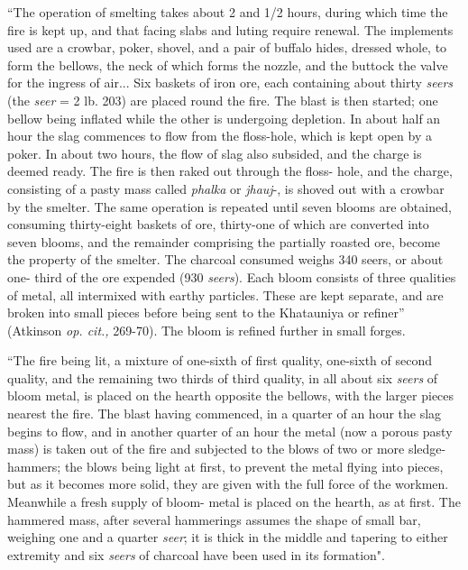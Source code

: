 {\footnotesize{“The operation of smelting takes about 2 and 1/2 hours, during which time the fire is kept up, and that facing slabs and luting require renewal. The implements used are a crowbar, poker, shovel, and a pair of buffalo hides, dressed whole, to form the bellows, the neck of which forms the nozzle, and the buttock the valve for the ingress of air... Six baskets of iron ore, each containing about thirty {\it seers} (the {\it seer}	= 2 lb. 203) are placed round the fire. The blast is then started; one bellow being inflated while the other is undergoing depletion. In about half an hour the slag commences to flow from the floss-hole, which is kept open by a poker. In about two hours, the flow of slag also subsided, and the charge is deemed ready. The fire is then raked out through the floss- hole, and the charge, consisting of a pasty mass called {\it phalka} or {\it jhauj}-, is shoved out with a crowbar by the smelter. The same operation is repeated until seven blooms are obtained, consuming thirty-eight baskets of ore, thirty-one of which are converted into seven blooms, and the remainder comprising the partially roasted ore, become the property of the smelter. The charcoal consumed weighs 340 seers, or about one- third of the ore expended (930 {\it seers}). Each bloom consists of three qualities of metal, all intermixed with earthy particles. These are kept separate, and are broken into small pieces before being sent to the Khatauniya or refiner”}} (Atkinson {\it op. cit.,} 269-70). The bloom is refined further in small forges.


{\footnotesize{``The fire being lit, a mixture of one-sixth of first quality, one-sixth of second quality, and the remaining two ­thirds of third quality, in all about six {\it seers} of bloom metal, is placed on the hearth opposite the bellows, with the larger pieces nearest the fire. The blast having commenced, in a quarter of an hour the slag begins to flow, and in another quarter of an hour the metal (now a porous pasty mass) is taken out of the fire and subjected to the blows of two or more sledge-hammers; the blows being light at first, to prevent the metal flying into pieces, but as it becomes more solid, they are given with the full force of the workmen. Meanwhile a fresh supply of bloom­- metal is placed on the hearth, as at first. The hammered mass, after several hammerings assumes the shape of small bar, weighing one and a quarter {\it seer}; it is thick in the middle and tapering to either extremity and six {\it seers} of charcoal have been used in its formation".}} 

